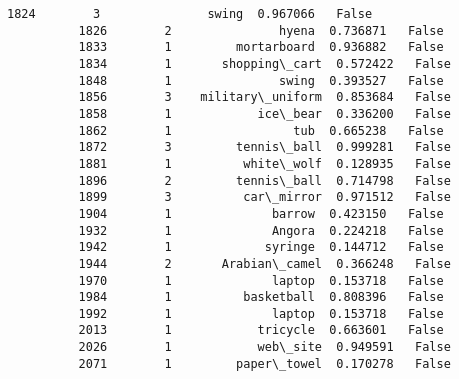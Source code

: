 \documentclass[11pt]{article}
\begin{document}
\begin{Verbatim}[commandchars=\\\{\}]
          1824        3               swing  0.967066   False   
          1826        2               hyena  0.736871   False   
          1833        1         mortarboard  0.936882   False   
          1834        1       shopping\_cart  0.572422   False   
          1848        1               swing  0.393527   False   
          1856        3    military\_uniform  0.853684   False   
          1858        1            ice\_bear  0.336200   False   
          1862        1                 tub  0.665238   False   
          1872        3         tennis\_ball  0.999281   False   
          1881        1          white\_wolf  0.128935   False   
          1896        2         tennis\_ball  0.714798   False   
          1899        3          car\_mirror  0.971512   False   
          1904        1              barrow  0.423150   False   
          1932        1              Angora  0.224218   False   
          1942        1             syringe  0.144712   False   
          1944        2       Arabian\_camel  0.366248   False   
          1970        1              laptop  0.153718   False   
          1984        1          basketball  0.808396   False   
          1992        1              laptop  0.153718   False   
          2013        1            tricycle  0.663601   False   
          2026        1            web\_site  0.949591   False   
          2071        1         paper\_towel  0.170278   False   
          

\end{Verbatim}
\end{document}
